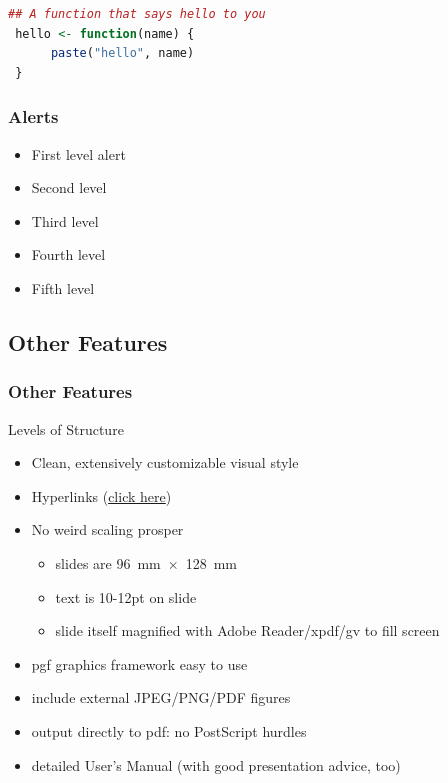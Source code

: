 \documentclass[11pt]{beamer}
\begin{document}
\begin{frame}[fragile]
\begin{lstlisting}[language=R]
 ## A function that says hello to you
 hello <- function(name) {
      paste("hello", name)
 }
\end{lstlisting}
\end{frame}

\begin{frame}
  \frametitle{Alerts}
  \begin{itemize}
     \item First level \alert{alert}
     \item Second level 
     \item Third level 
     \item Fourth level 
     \item Fifth level 
  \end{itemize}

\end{frame}
  

\subsection{Other Features}

\begin{frame}
  \frametitle{Other Features}

  \begin{block}{Levels of Structure}
    \begin{itemize}
    \item Clean, extensively customizable visual style
      
    \item Hyperlinks (\href{http://github.com/izahn/iqss-beamer-theme}{click here}) 
      \item No weird scaling prosper
      \begin{itemize}
        \item slides are 96~mm~$\times$~128~mm
        
        \item text is 10-12pt on slide
        
        \item slide itself magnified with Adobe Reader/xpdf/gv to fill screen
      \end{itemize}
      
      \item pgf graphics framework easy to use
      
      \item include external JPEG/PNG/PDF figures
      
      \item output directly to pdf: no PostScript hurdles
      
      \item detailed User's Manual (with good presentation advice, too)
    \end{itemize}
  \end{block}
\end{frame}
\end{document}

